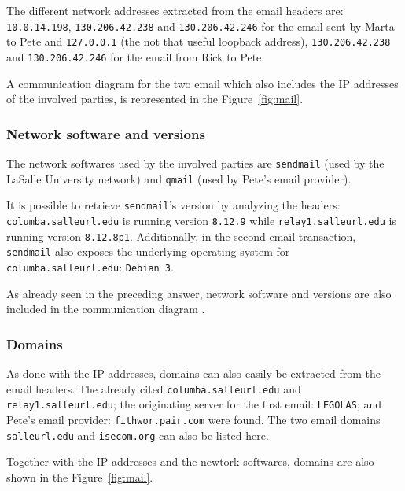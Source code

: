 The different network addresses extracted from the email headers are: \texttt{10.0.14.198}, \texttt{130.206.42.238} and \texttt{130.206.42.246} for the email sent by Marta to Pete and \texttt{127.0.0.1} (the not that useful loopback address), \texttt{130.206.42.238} and \texttt{130.206.42.246} for the email from Rick to Pete.

A communication diagram for the two email which also includes the IP addresses of the involved parties, is represented in the Figure~\vref{fig:mail}.


\subsubsection{Network software and versions}

The network softwares used by the involved parties are \texttt{sendmail} (used by the LaSalle University network) and \texttt{qmail} (used by Pete's email provider).

It is possible to retrieve \texttt{sendmail}'s version by analyzing the headers: \texttt{columba.salleurl.edu} is running version {\tt 8.12.9} while \texttt{relay1.salleurl.edu} is running version {\tt 8.12.8p1}. Additionally, in the second email transaction, \texttt{sendmail} also exposes the underlying operating system for \texttt{columba.salleurl.edu}: \texttt{Debian 3}.

As already seen in the preceding answer, network software and versions are also included in the communication diagram .


\subsubsection{Domains}

As done with the IP addresses, domains can also easily be extracted from the email headers. The already cited {\tt columba.salleurl.edu} and {\tt relay1.salleurl.edu}; the originating server for the first email: {\tt LEGOLAS}; and Pete's email provider: {\tt fithwor.pair.com} were found. The two email domains {\tt salleurl.edu} and {\tt isecom.org} can also be listed here.

Together with the IP addresses and the newtork softwares, domains are also shown in the Figure~\vref{fig:mail}.

